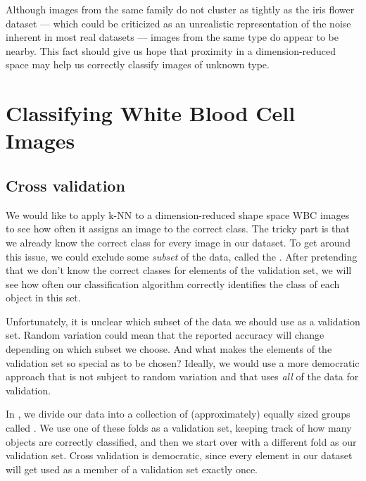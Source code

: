 Although images from the same family do not cluster as tightly as the iris flower dataset --- which could be criticized as an unrealistic representation of the noise inherent in most real datasets --- images from the same type do appear to be nearby. This fact should give us hope that proximity in a dimension-reduced space may help us correctly classify images of unknown type.

\FloatBarrier
{}

\section{Classifying White Blood Cell Images}
\label{sec:training}

\subsection{Cross validation}

We would like to apply k-NN to a dimension-reduced shape space WBC images to see how often it assigns an image to the correct class. The tricky part is that we already know the correct class for every image in our dataset. To get around this issue, we could exclude some \textit{subset} of the data, called the . After pretending that we don't know the correct classes for elements of the validation set, we will see how often our classification algorithm correctly identifies the class of each object in this set.\\

\begin{qbox}\end{qbox}

Unfortunately, it is unclear which subset of the data we should use as a validation set. Random variation could mean that the reported accuracy will change depending on which subset we choose. And what makes the elements of the validation set so special as to be chosen? Ideally, we would use a more democratic approach that is not subject to random variation and that uses \textit{all} of the data for validation.

In , we divide our data into a collection of  (approximately) equally sized groups called . We use one of these folds as a validation set, keeping track of how many objects are correctly classified, and then we start over with a different fold as our validation set. Cross validation is democratic, since every element in our dataset will get used as a member of a validation set exactly once.

